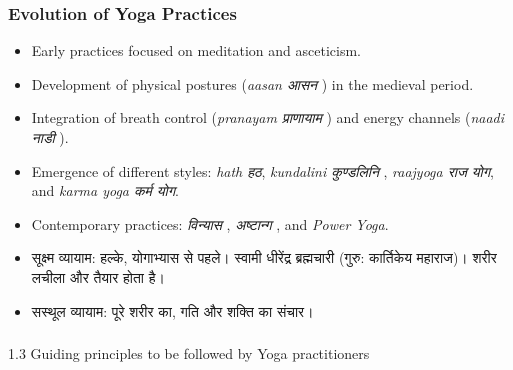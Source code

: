 \begin{frame}[fragile]\frametitle{Evolution of Yoga Practices}

      \begin{itemize}
		\item Early practices focused on meditation and asceticism.
		\item Development of physical postures (\textit{aasan आसन }) in the medieval period.
		\item Integration of breath control (\textit{pranayam प्राणायाम }) and energy channels (\textit{naadi नाडी }).
		\item Emergence of different styles: \textit{hath हठ}, \textit{kundalini कुण्डलिनि }, \textit{raajyoga राज योग}, and \textit{karma yoga कर्म  योग}.
		\item Contemporary practices: \textit{विन्यास }, \textit{अष्टान्ग }, and \textit{Power Yoga}.
		\item सूक्ष्म व्यायाम: हल्के, योगाभ्यास से पहले। स्वामी धीरेंद्र ब्रह्मचारी (गुरु: कार्तिकेय महाराज)। शरीर लचीला और तैयार होता है।
		\item सस्थूल व्यायाम: पूरे शरीर का, गति और शक्ति का संचार।
	  \end{itemize}

\end{frame}



\begin{frame}[fragile]\frametitle{}
\begin{center}
{\Large 1.3 Guiding principles to be followed by Yoga practitioners}
\end{center}
\end{frame}

